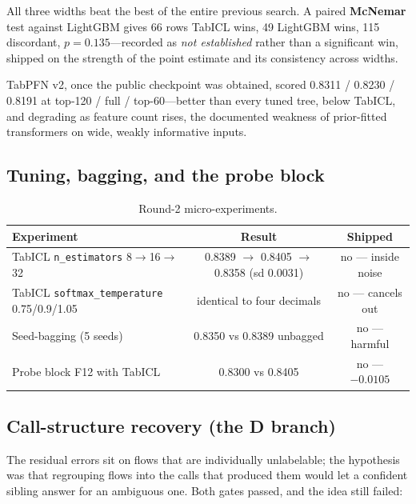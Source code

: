 \documentclass[11pt]{article}
\begin{document}
All three widths beat the best of the entire previous search. A paired \textbf{McNemar} test against
LightGBM gives 66 rows TabICL wins, 49 LightGBM wins, 115 discordant, \textbf{$p = 0.135$}---recorded as
\emph{not established} rather than a significant win, shipped on the strength of the point estimate and its
consistency across widths.

TabPFN v2, once the public checkpoint was obtained, scored 0.8311 / 0.8230 / 0.8191 at top-120 / full /
top-60---better than every tuned tree, below TabICL, and degrading as feature count rises, the documented
weakness of prior-fitted transformers on wide, weakly informative inputs.

\subsection{Tuning, bagging, and the probe block}

\begin{table}[htbp]
\centering\small
\caption{Round-2 micro-experiments.}
\label{tab:round2exp}
\begin{tabular}{lcc}
\toprule
Experiment & Result & Shipped \\
\midrule
TabICL \texttt{n\_estimators} 8$\rightarrow$16$\rightarrow$32 & 0.8389 $\rightarrow$ 0.8405 $\rightarrow$ 0.8358 (sd 0.0031) & no --- inside noise \\
TabICL \texttt{softmax\_temperature} 0.75/0.9/1.05 & identical to four decimals & no --- cancels out \\
Seed-bagging (5 seeds) & 0.8350 vs 0.8389 unbagged & no --- harmful \\
Probe block F12 with TabICL & 0.8300 vs 0.8405 & no --- $-0.0105$ \\
\bottomrule
\end{tabular}
\end{table}

\subsection{Call-structure recovery (the D branch)}

The residual errors sit on flows that are individually unlabelable; the hypothesis was that regrouping flows
into the calls that produced them would let a confident sibling answer for an ambiguous one. Both gates
passed, and the idea still failed:
\end{document}
